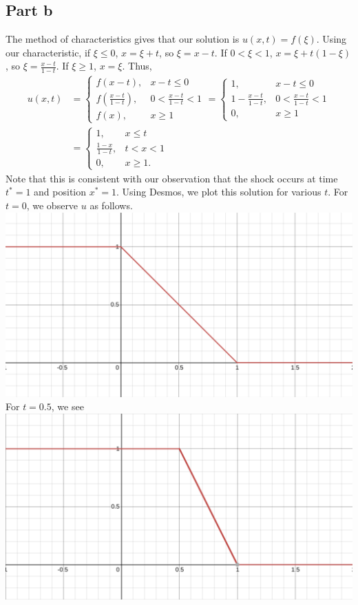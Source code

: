 \documentclass{article}
\begin{document}
\subsection{Part b}
The method of characteristics gives that our solution is $u(x,t)=f(\xi)$. Using our characteristic, if $\xi\leq0$, $x=\xi+t$, so $\xi=x-t$. If $0<\xi<1$, $x=\xi+t(1-\xi)$, so $\xi=\frac{x-t}{1-t}$. If $\xi\geq1$, $x=\xi$. Thus,
\begin{align*}
u(x,t)&=\begin{cases}
	f(x-t), &x-t\leq0\\
	f\left(\frac{x-t}{1-t}\right), &0<\frac{x-t}{1-t}<1\\
	f(x), &x\geq1
\end{cases}=\begin{cases}
1, &x-t\leq0\\
1-\frac{x-t}{1-t}, &0<\frac{x-t}{1-t}<1\\
0, &x\geq1
\end{cases}\\&=
\begin{cases}
	1, &x\leq t\\
	\frac{1-x}{1-t}, &t<x<1\\
	0, &x\geq1.
\end{cases}
\end{align*}
Note that this is consistent with our observation that the shock occurs at time $t^*=1$ and position $x^*=1$. Using Desmos, we plot this solution for various $t$. For $t=0$, we observe $u$ as follows.\\
\includegraphics[scale=0.3]{graph1.png}\\
For $t=0.5$, we see \\
\includegraphics[scale=0.3]{graph2.png}\\
\end{document}
